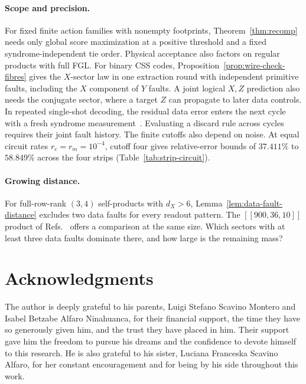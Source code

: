 \documentclass[10pt,twocolumn]{article}
\theoremstyle{definition}
\begin{document}
\paragraph{Scope and precision.}
For fixed finite action families with nonempty footprints,
Theorem~\ref{thm:recomp} needs only global score maximization at a
positive threshold and a fixed syndrome-independent tie order.
Physical acceptance also factors on regular products with full FGL.
For binary CSS codes, Proposition~\ref{prop:wire-check-fibres} gives
the $X$-sector law in one extraction round with independent primitive
faults, including the $X$ component of $Y$ faults. A joint logical
$X,Z$ prediction also needs the conjugate sector, where a target $Z$
can propagate to later data controls. In repeated single-shot decoding,
the residual data error enters the next cycle with a fresh syndrome
measurement~\cite{FGL18}. Evaluating a discard rule across cycles requires
their joint fault history.
The finite cutoffs also depend on noise. At equal circuit rates
$r_c=r_m=10^{-4}$, cutoff four gives relative-error bounds of
$37.411\%$ to $58.849\%$ across the four strips
(Table~\ref{tab:strip-circuit}).

\paragraph{Growing distance.}
For full-row-rank $(3,4)$ self-products with $d_X>6$,
Lemma~\ref{lem:data-fault-distance} excludes two data faults for every
readout pattern. The $[[900,36,10]]$ product of Refs.~\cite{RV21,QUITS25}
offers a comparison at the same size. Which sectors with at least
three data faults dominate there, and how large is the remaining mass?

\section*{Acknowledgments}
\begingroup\small
The author is deeply grateful to his parents, Luigi Stefano Scavino Montero
and Isabel Betzabe Alfaro Ninahuanca, for their financial support, the
time they have so generously given him, and the trust they have placed in
him. Their support gave him the freedom to pursue his dreams and the
confidence to devote himself to this research. He is also grateful to his
sister, Luciana Franceska Scavino Alfaro, for her constant encouragement
and for being by his side throughout this work.\par
\endgroup
\end{document}
